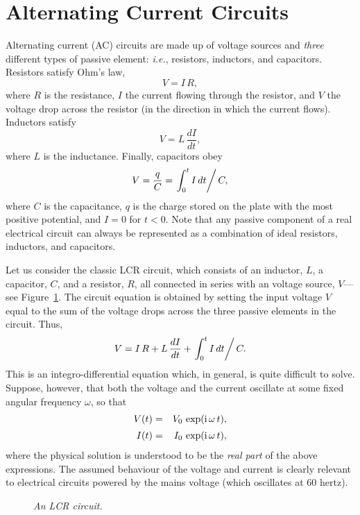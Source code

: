\section{Alternating Current Circuits}
Alternating current (AC) circuits are made up of voltage sources and {\em three}\/
different types of passive element: {\em i.e.}, resistors, inductors,
and capacitors.  Resistors satisfy Ohm's law,
\begin{equation}
V = I \,R,
\end{equation}
where $R$ is the resistance, $I$ the current flowing through the resistor, and
$V$ the voltage drop across the resistor (in the direction in which the current
flows). Inductors satisfy
\begin{equation}
V = L\, \frac{dI}{dt},
\end{equation}
where $L$ is the inductance. Finally, capacitors obey
\begin{equation}
V = \frac{q}{C} = \left.\int_0^t I\,dt\right/C,
\end{equation}
where $C$ is the capacitance, $q$ is the charge stored on the plate with the most
positive potential, and $I=0$ for $t<0$. Note that any 
passive component of a real electrical
circuit can always be represented as a combination of ideal resistors, inductors, and
capacitors. 


Let us consider the classic LCR circuit, which consists of an inductor, $L$, a
capacitor, $C$, and a resistor, $R$, all connected in series with an voltage source,
$V$---see Figure~\ref{flcr}. The circuit equation is obtained by setting the input voltage $V$  equal to
the sum of the voltage drops across the three passive elements in the circuit. 
Thus,
\begin{equation}\label{e776}
V = I\,R+ L\,\frac{dI}{dt} + \left.\int_0^t I\,dt\right/C.
\end{equation}
This is an integro-differential equation which, in general, is quite difficult to
solve. Suppose, however, that both the voltage and the current 
oscillate at some fixed angular frequency $\omega$, so that
\begin{eqnarray}
V(t) &=& V_0\, \exp({\rm i}\,\omega\, t),\\[0.5ex]
I(t) &=& I_0 \,\exp({\rm i}\,\omega \,t),\label{e777}
\end{eqnarray}
where the physical solution is understood to be the {\em real part} of
the above expressions. The assumed behaviour of the voltage and current is
clearly relevant to electrical
 circuits powered by the mains voltage (which oscillates at 60 hertz). 
 \begin{figure}
\epsfysize=2.5in
\centerline{}
\caption{\em An LCR circuit.}\label{flcr}
\end{figure}



